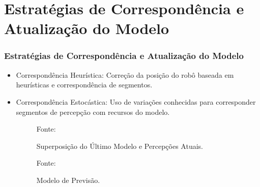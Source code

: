 \documentclass[xcolor=dvipsnames, aspectratio=169]{beamer}
\begin{document}
\section{Estratégias de Correspondência e Atualização do Modelo}
  \begin{frame}
  \frametitle{Estratégias de Correspondência e Atualização do Modelo}
  \begin{itemize}
      \item Correspondência Heurística: Correção da posição do robô baseada em heurísticas e correspondência de segmentos.
      \item Correspondência Estocástica: Uso de variações conhecidas para corresponder segmentos de percepção com recursos do modelo.
      \begin{figure}
        \centering
        {Fonte: \cite{buniyamin2011simple}}
        \caption{Superposição do Último Modelo e Percepções Atuais.}
        \label{fig:3}
      \end{figure}

      \begin{figure}
        \centering
        {Fonte: \cite{buniyamin2011simple}}
        \caption{Modelo de Previsão.}
        \label{fig:4}
      \end{figure}


\end{itemize}
\end{frame}
\end{document}
